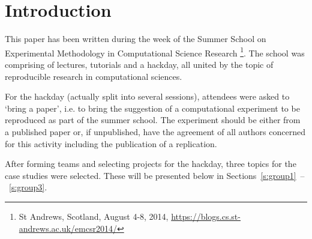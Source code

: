 \section{Introduction}
\label{s:intro}

This paper has been written during the week of the Summer School
on Experimental Methodology in Computational Science Research
\footnote{St Andrews, Scotland, August 4-8, 2014,
\url{https://blogs.cs.st-andrews.ac.uk/emcsr2014/}}. The 
school was comprising of lectures, tutorials and a hackday,
all united by the topic of reproducible research in computational
sciences. 

For the hackday (actually split into several sessions), attendees 
were asked to `bring a paper', i.e. to bring the suggestion of a 
computational experiment to be reproduced as part of the summer school. 
The experiment should be either from a published paper or, if unpublished, 
have the agreement of all authors concerned for this activity including 
the publication of a replication. 

After forming teams and selecting projects for the hackday, three
topics for the case studies were selected. These will be presented below
in Sections~\ref{s:group1}~--~\ref{s:group3}.



